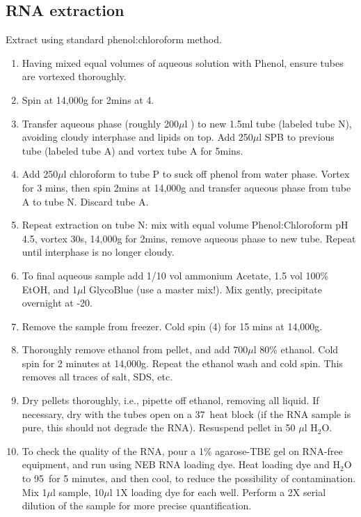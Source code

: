 \documentclass{article}
\newcommand{\mul}{\ensuremath{\mu}l }
\begin{document}
\subsection*{RNA extraction}
Extract using standard phenol:chloroform method.
\begin{enumerate}[resume]
  \item Having mixed equal volumes of aqueous solution with Phenol, ensure tubes are vortexed thoroughly.
  \item Spin at 14,000g for 2mins at 4\celsius. 
  \item Transfer aqueous phase (roughly 200\mul) to new 1.5ml tube  (labeled tube N), avoiding cloudy interphase and lipids on top. Add 250\mul SPB to previous tube (labeled tube A) and vortex tube A for 5mins.
\item Add 250\mul chloroform to tube P to suck off phenol from water phase. Vortex for 3 mins, then spin 2mins at 14,000g and transfer aqueous phase from tube A to tube N. Discard tube A.
  \item Repeat extraction on tube N: mix with equal volume Phenol:Chloroform pH 4.5, vortex 30s, 14,000g for 2mins, remove aqueous phase to new tube. Repeat until interphase is no longer cloudy.
  \item To final aqueous sample add 1/10 vol ammonium Acetate, 1.5 vol 100\% EtOH, and 1\mul GlycoBlue (use a master mix!). Mix gently, precipitate overnight at -20\celsius.
  \item Remove the sample from freezer. Cold spin (4\celsius) for 15 mins at 14,000g. 
\item Thoroughly remove ethanol from pellet, and add 700\mul 80\% ethanol. Cold spin for 2 minutes at 14,000g. Repeat the ethanol wash and cold spin. This removes all traces of salt, SDS, etc.
\item Dry pellets thoroughly, i.e., pipette off ethanol, removing all liquid. If necessary, dry with the tubes open on a 37\celsius\ heat block (if the RNA sample is pure, this should not degrade the RNA). Resuspend pellet in 50 \mul H$_2$O.
\item To check the quality of the RNA, pour a 1\% agarose-TBE gel on RNA-free equipment, and run using NEB RNA loading dye. Heat loading dye and H$_2$O to 95\celsius\ for 5 minutes, and then cool, to reduce the possibility of contamination. Mix 1\mul sample, 10\mul 1X loading dye for each well. Perform a 2X serial dilution of the sample for more precise quantification.
\end{enumerate}
\end{document}
